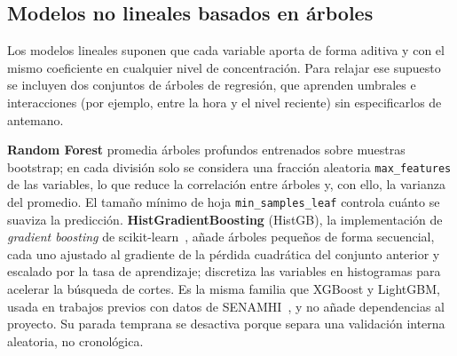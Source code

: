 \subsection{Modelos no lineales basados en árboles}
\label{sec:no-lineales}
Los modelos lineales suponen que cada variable aporta de forma aditiva y con el mismo coeficiente en cualquier nivel de concentración. Para relajar ese supuesto se incluyen dos conjuntos de árboles de regresión, que aprenden umbrales e interacciones (por ejemplo, entre la hora y el nivel reciente) sin especificarlos de antemano.

\textbf{Random Forest} promedia árboles profundos entrenados sobre muestras bootstrap; en cada división solo se considera una fracción aleatoria \texttt{max\_features} de las variables, lo que reduce la correlación entre árboles y, con ello, la varianza del promedio. El tamaño mínimo de hoja \texttt{min\_samples\_leaf} controla cuánto se suaviza la predicción. \textbf{HistGradientBoosting} (HistGB), la implementación de \emph{gradient boosting} de scikit-learn~\cite{pedregosa2011sklearn}, añade árboles pequeños de forma secuencial, cada uno ajustado al gradiente de la pérdida cuadrática del conjunto anterior y escalado por la tasa de aprendizaje; discretiza las variables en histogramas para acelerar la búsqueda de cortes. Es la misma familia que XGBoost y LightGBM, usada en trabajos previos con datos de SENAMHI~\cite{oblitas2024xgboost,chen2016xgboost}, y no añade dependencias al proyecto. Su parada temprana se desactiva porque separa una validación interna aleatoria, no cronológica.

